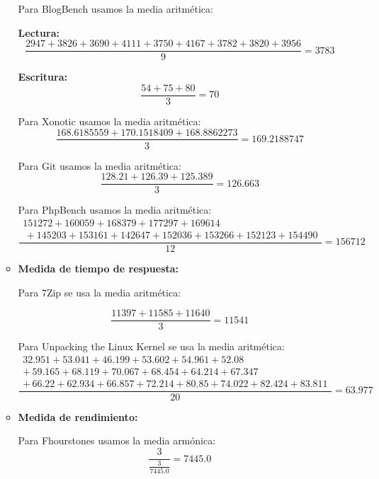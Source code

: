 \documentclass[12pt]{article}
\newcommand{\pl}[1]{\item \textbf{ #1 }}
\begin{document}
\begin{enumerate}[label=(\arabic{section}.\arabic{subsection}.\arabic{enumi})]
\begin{itemize}
        \vspace{0.5cm}
        Para BlogBench usamos la media aritmética:
        
        \textbf{Lectura:}
        \begin{equation*}
            \frac{2947 + 3826 + 3690 + 4111 + 3750 + 4167 + 3782 + 3820 + 3956}{9} = 3783
        \end{equation*}

        \textbf{Escritura:}
        \begin{equation*}
            \frac{54 + 75 + 80}{3} = 70
        \end{equation*}

        \vspace{0.5cm}
        Para Xonotic usamos la media aritmética:
        \begin{equation*}
            \frac{168.6185559 + 170.1518409 + 168.8862273}{3} = 169.2188747
        \end{equation*}

        \vspace{0.5cm}
        Para Git usamos la media aritmética:
        \begin{equation*}
            \frac{128.21 + 126.39 + 125.389}{3} = 126.663
        \end{equation*}

        \vspace{0.5cm}
        Para PhpBench usamos la media aritmética:
         \[
        \frac{\begin{split}
            151272 + 160059 + 168379 + 177297 + 169614 \\
            \, + 145203 + 153161 + 142647 + 152036 + 153266 + 152123 + 154490
        \end{split}}{12} = 156712
        \]
        \pl{Medida de tiempo de respuesta:}\par
        Para 7Zip se usa la media aritmética:\par
        \begin{equation*}
            \frac{11397+11585+11640}{3}=11541
        \end{equation*}

        \vspace{0.5cm}
        Para Unpacking the Linux Kernel se usa la media aritmética:
        \[
        \frac{\begin{split}
            32.951 + 53.041 + 46.199 + 53.602 + 54.961 + 52.08 \\
            + \, 59.165 + 68.119 + 70.067 + 68.454 + 64.214 + 67.347 \\
            + \, 66.22 + 62.934 + 66.857 + 72.214 + 80.85 + 74.022 + 82.424 + 83.811
        \end{split}}{20} = 63.977
        \]
        \pl{Medida de rendimiento:} \par
        Para Fhourstones usamos la media armónica:
        \begin{equation*}
            \frac{3}{\frac{3}{7445.0}} = 7445.0
        \end{equation*}


\end{itemize}
\end{enumerate}
\end{document}
